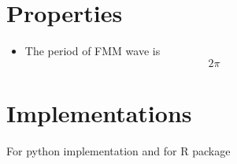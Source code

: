 \documentclass[a4paper]{article}
\begin{document}
   \section{Properties}
      \begin{itemize}
         \item The period of FMM wave is $$2\pi$$
      \end{itemize}


   \section{Implementations}
      For python implementation  and for R package 


      
      
\end{document}
